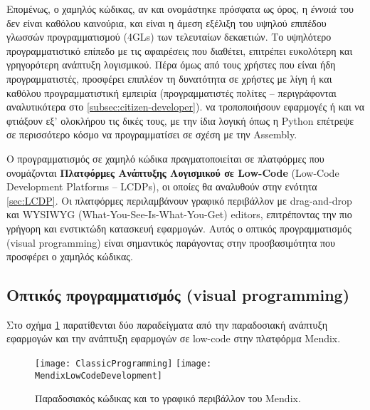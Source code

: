         Επομένως, ο χαμηλός κώδικας, αν και ονομάστηκε πρόσφατα ως όρος, η \textit{έννοιά} του δεν είναι καθόλου καινούρια, και είναι η άμεση εξέλιξη του υψηλού επιπέδου γλωσσών προγραμματισμού (4GLs) των τελευταίων δεκαετιών. Το υψηλότερο προγραμματιστικό επίπεδο με τις αφαιρέσεις που διαθέτει, επιτρέπει ευκολότερη και γρηγορότερη ανάπτυξη λογισμικού. Πέρα όμως από τους χρήστες που είναι ήδη προγραμματιστές, προσφέρει επιπλέον τη δυνατότητα σε χρήστες με λίγη ή και καθόλου προγραμματιστική εμπειρία (προγραμματιστές πολίτες -- περιγράφονται αναλυτικότερα στο \ref{subsec:citizen-developer}). να τροποποιήσουν εφαρμογές ή και να φτιάξουν εξ' ολοκλήρου τις δικές τους, με την ίδια λογική όπως η Python επέτρεψε σε περισσότερο κόσμο να προγραμματίσει σε σχέση με την Assembly.

        Ο προγραμματισμός σε χαμηλό κώδικα πραγματοποιείται σε πλατφόρμες που ονομάζονται \textbf{Πλατφόρμες Ανάπτυξης Λογισμικού σε Low-Code} (Low-Code Development Platforms -- LCDPs), οι οποίες θα αναλυθούν στην ενότητα \ref{sec:LCDP}. Οι πλατφόρμες περιλαμβάνουν γραφικό περιβάλλον με drag-and-drop και WYSIWYG (What-You-See-Is-What-You-Get) editors, επιτρέποντας την πιο γρήγορη και ενστικτώδη κατασκευή εφαρμογών. Αυτός ο οπτικός προγραμματισμός (visual programming) είναι σημαντικός παράγοντας στην προσβασιμότητα που προσφέρει ο χαμηλός κώδικας. \cite{LowCodeMendix} \cite{LowCodeSimon} \cite{LowCodeDemocratization}

            \subsection{Οπτικός προγραμματισμός (visual programming)}
                Στο σχήμα \ref{fig:codevsmendix} παρατίθενται δύο παραδείγματα από την παραδοσιακή ανάπτυξη εφαρμογών και την ανάπτυξη εφαρμογών σε low-code στην πλατφόρμα Mendix.

                \begin{figure}[h!] \noindent \centering
                        \texttt{[image: ClassicProgramming]}
                        \texttt{[image: MendixLowCodeDevelopment]}
                        \caption{Παραδοσιακός κώδικας και το γραφικό περιβάλλον του Mendix.}
                        \label{fig:codevsmendix}
                \end{figure}

